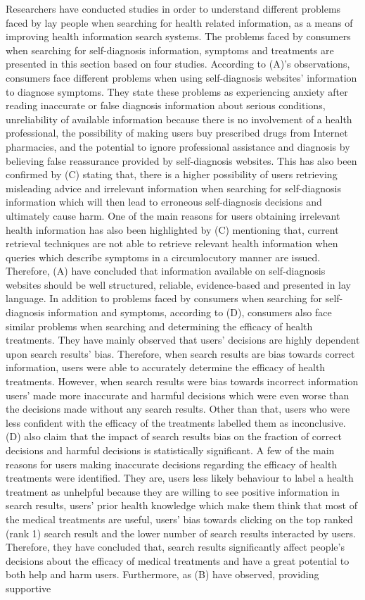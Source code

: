 \documentclass[]{article}
\begin{document}
Researchers have conducted studies in order to understand different problems faced by lay people when searching for health related information, as a means of improving health information search systems. The problems faced by consumers when searching for self-diagnosis information, symptoms and treatments are presented in this section based on four studies. According to (A)'s observations, consumers face different problems when using self-diagnosis websites' information to diagnose symptoms. They state these problems as experiencing anxiety after reading inaccurate or false diagnosis information about serious conditions, unreliability of available information because there is no involvement of a health professional, the possibility of making users buy prescribed drugs from Internet pharmacies, and the potential to ignore professional assistance and diagnosis by believing false reassurance provided by self-diagnosis websites. This has also been confirmed by (C) stating that, there is a higher possibility of users retrieving misleading advice and irrelevant information when searching for self-diagnosis information which will then lead to erroneous self-diagnosis decisions and ultimately cause harm. One of the main reasons for users obtaining irrelevant health information has also been highlighted by (C) mentioning that, current retrieval techniques are not able to retrieve relevant health information when queries which describe symptoms in a circumlocutory manner are issued. Therefore, (A) have concluded that information available on self-diagnosis websites should be well structured, reliable, evidence-based and presented in lay language. In addition to problems faced by consumers when searching for self-diagnosis information and symptoms, according to (D), consumers also face similar problems when searching and determining the efficacy of health treatments. They have mainly observed that users' decisions are highly dependent upon search results' bias. Therefore, when search results are bias towards correct information, users were able to accurately determine the efficacy of health treatments. However, when search results were bias towards incorrect information users’ made more inaccurate and harmful decisions which were even worse than the decisions made without any search results. Other than that, users who were less confident with the efficacy of the treatments labelled them as inconclusive. (D) also claim that the impact of search results bias on the fraction of correct decisions and harmful decisions is statistically significant. A few of the main reasons for users making inaccurate decisions regarding the efficacy of health treatments were identified. They are, users less likely behaviour to label a health treatment as unhelpful because they are willing to see positive information in search results, users' prior health knowledge which make them think that most of the medical treatments are useful, users' bias towards clicking on the top ranked (rank 1) search result and the lower number of search results interacted by users. Therefore, they have concluded that, search results significantly affect people’s decisions about the efficacy of medical treatments and have a great potential to both help and harm users. Furthermore, as (B) have observed, providing supportive 
\end{document}
